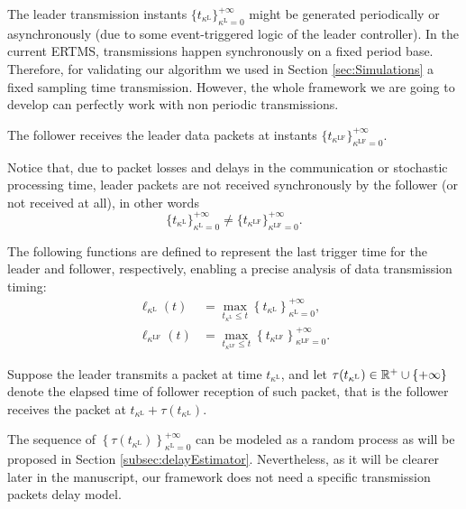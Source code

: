 \documentclass[letterpaper, 10 pt, conference]{ieeeconf}
\theoremstyle{definition}
\theoremstyle{nopoint}
\begin{document}
The leader transmission instants \(\{ t_{\kappa^\mathrm{L}} \}_{\kappa^\mathrm{L}=0}^{+\infty}\) might be generated periodically or asynchronously (due to some event-triggered logic of the leader controller). In the current ERTMS, transmissions happen synchronously on a fixed period base. Therefore, for validating our algorithm we used in Section \ref{sec:Simulations} 
a fixed sampling time transmission. However, the whole framework we are going to develop can perfectly work with non periodic transmissions. 

The follower receives the leader data packets at instants  \(\{ t_{\kappa^\mathrm{LF}} \}_{\kappa^\mathrm{LF}=0}^{+\infty}\).

Notice that, due to packet losses and delays  in the communication or stochastic processing time, leader packets are not received synchronously by the follower (or not received at all), in other words
	\[\{ t_{\kappa^\mathrm{L}} \}_{\kappa^\mathrm{L}=0}^{+\infty} \neq \{ t_{\kappa^\mathrm{LF}} \}_{\kappa^\mathrm{LF}=0}^{+\infty}.\]
	


The following functions are defined to represent the last trigger time for the leader and follower, respectively, enabling a precise analysis of data transmission timing:
\begin{align*}
	\ell_{\kappa^\mathrm{L}}(t) &= \max_{t_{\kappa^\mathrm{L}} \leq t} \left \{ t_{\kappa^\mathrm{L}} \right \}_{\kappa^\mathrm{L}=0}^{+\infty}, \\
	\ell_{\kappa^\mathrm{LF}}(t) &= \max_{t_{\kappa^\mathrm{LF}} \leq t} \left \{ t_{\kappa^\mathrm{LF}} \right \}_{\kappa^\mathrm{LF}=0}^{+\infty}.
\end{align*}


Suppose the leader transmits a packet at time $t_{\kappa^\mathrm{L}}$, and let $\tau(t_{\kappa^\mathrm{L}})\in \Bbb{R}^+ \cup \{+\infty\}$ denote the elapsed time of follower reception of such packet, that is the follower receives the packet at $t_{\kappa^\mathrm{L}} + \tau(t_{\kappa^\mathrm{L}})$. 


The sequence of $ \left\{ \tau(t_{\kappa^\mathrm{L}})\right\}_{\kappa^\mathrm{L}=0}^{+\infty}$ can be modeled as a random process as will be proposed in Section \ref{subsec:delayEstimator}. Nevertheless, as it will be clearer later in the manuscript, our framework does not need a specific transmission packets delay model.
\end{document}
